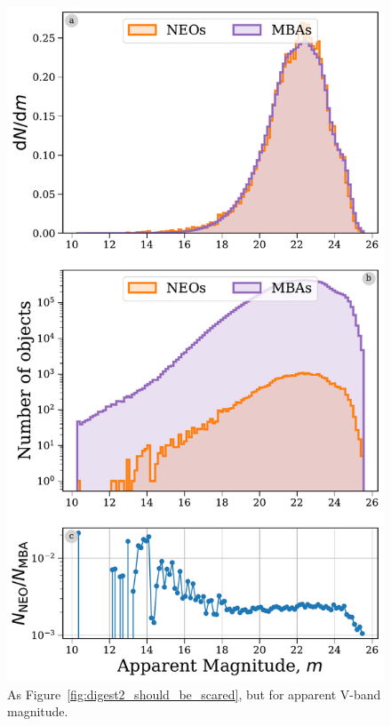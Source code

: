 \documentclass[preprint2, twocolappendix]{aastex631}
\begin{document}
\begin{figure}[htb]
    \centering
    \includegraphics[width=\columnwidth]{figures/apparent_mag_dist_all.pdf}
    \caption{As Figure~\ref{fig:digest2_should_be_scared}, but for apparent V-band magnitude.}
    \label{fig:app_mag_all}
\end{figure}
\end{document}
